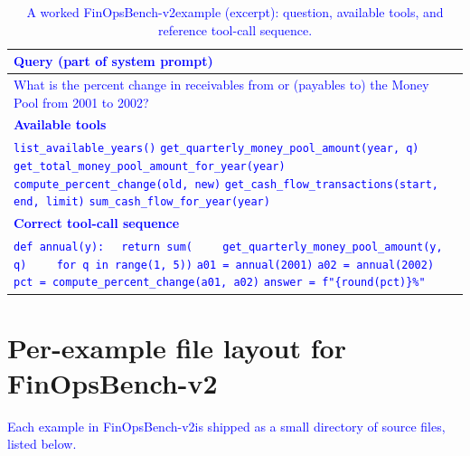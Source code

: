 \documentclass[11pt]{article}
\newcommand{\edit}[1]{\textcolor{blue}{#1}}
\newcommand{\groundedfinqa}{FinOpsBench-v2}\xspace
\begin{document}
\edit{\begin{table}[t]
\centering
\scriptsize
\setlength{\tabcolsep}{3pt}
\renewcommand{\arraystretch}{1.1}
\begin{tabularx}{\columnwidth}{@{}X@{}}
\toprule
\textbf{Query (part of system prompt)} \\
\midrule
What is the percent change in receivables from or (payables to) the Money Pool from 2001 to 2002? \\
\midrule
\textbf{Available tools} \\
\midrule
\texttt{list\_available\_years()} \newline
\texttt{get\_quarterly\_money\_pool\_amount(year, q)} \newline
\texttt{get\_total\_money\_pool\_amount\_for\_year(year)} \newline
\texttt{compute\_percent\_change(old, new)} \newline
\texttt{get\_cash\_flow\_transactions(start, end, limit)} \newline
\texttt{sum\_cash\_flow\_for\_year(year)} \\
\midrule
\textbf{Correct tool-call sequence} \\
\midrule
\texttt{def annual(y):} \newline
\texttt{\ \ return sum(} \newline
\texttt{\ \ \ \ get\_quarterly\_money\_pool\_amount(y, q)} \newline
\texttt{\ \ \ \ for q in range(1, 5))} \newline
\texttt{a01 = annual(2001)} \newline
\texttt{a02 = annual(2002)} \newline
\texttt{pct = compute\_percent\_change(a01, a02)} \newline
\texttt{answer = f"\{round(pct)\}\%"} \\
\bottomrule
\end{tabularx}
\caption{A worked \groundedfinqa example (excerpt): question, available tools, and reference tool-call sequence.}
\label{tab:example}
\end{table}}

\section{Per-example file layout for \groundedfinqa}
\label{app:v2_file_layout}

\edit{Each example in \groundedfinqa is shipped as a small directory of source files, listed below.}
\end{document}
